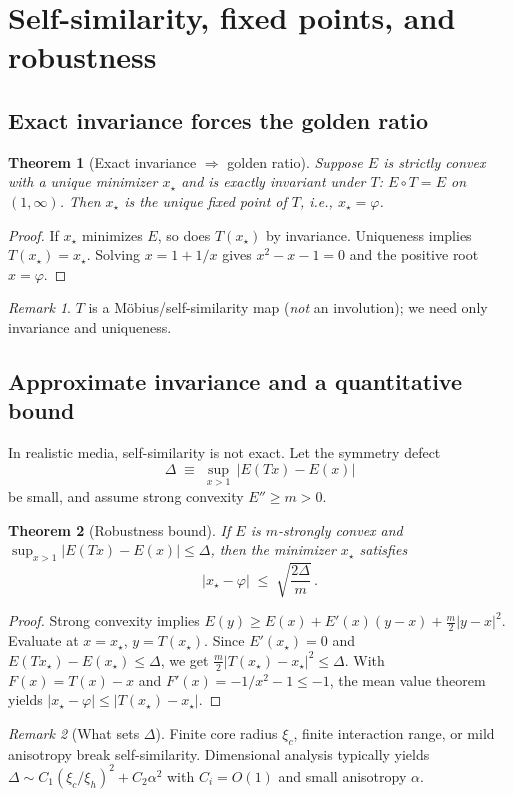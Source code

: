 \documentclass[11pt]{article}
\newtheorem{theorem}{Theorem}
\theoremstyle{remark}
\newtheorem{remark}{Remark}
\theoremstyle{definition}
\newcommand{\ph}{\varphi}
\begin{document}
\section{Self-similarity, fixed points, and robustness}
\subsection{Exact invariance forces the golden ratio}
\begin{theorem}[Exact invariance $\Rightarrow$ golden ratio]
Suppose $E$ is strictly convex with a unique minimizer $x_\star$ and is exactly invariant under $T$: $E\circ T=E$ on $(1,\infty)$. Then $x_\star$ is the unique fixed point of $T$, i.e., $x_\star=\ph$.
\end{theorem}
\begin{proof}
If $x_\star$ minimizes $E$, so does $T(x_\star)$ by invariance. Uniqueness implies $T(x_\star)=x_\star$. Solving $x=1+1/x$ gives $x^2-x-1=0$ and the positive root $x=\ph$.
\end{proof}
\begin{remark}
$T$ is a M\"obius/self-similarity map (\emph{not} an involution); we need only invariance and uniqueness.
\end{remark}

\subsection{Approximate invariance and a quantitative bound}
In realistic media, self-similarity is not exact. Let the symmetry defect
\begin{equation}
 \Delta\;\equiv\;\sup_{x>1}\,\bigl|E(Tx)-E(x)\bigr|
\end{equation}
be small, and assume strong convexity $E''\ge m>0$.
\begin{theorem}[Robustness bound]
\label{thm:robust}
If $E$ is $m$-strongly convex and $\sup_{x>1}|E(Tx)-E(x)|\le \Delta$, then the minimizer $x_\star$ satisfies
\begin{equation}
 \bigl|x_\star-\ph\bigr|\;\le\;\sqrt{\frac{2\Delta}{m}}\,.
\end{equation}
\end{theorem}
\begin{proof}
Strong convexity implies $E(y)\ge E(x)+E'(x)(y-x)+\tfrac{m}{2}|y-x|^2$. Evaluate at $x=x_\star$, $y=T(x_\star)$. Since $E'(x_\star)=0$ and $E(Tx_\star)-E(x_\star)\le \Delta$, we get $\tfrac{m}{2}|T(x_\star)-x_\star|^2\le \Delta$. With $F(x)=T(x)-x$ and $F'(x)=-1/x^2-1\le-1$, the mean value theorem yields $|x_\star-\ph|\le |T(x_\star)-x_\star|$.
\end{proof}
\begin{remark}[What sets $\Delta$]
Finite core radius $\xi_c$, finite interaction range, or mild anisotropy break self-similarity. Dimensional analysis typically yields $\Delta\sim C_1(\xi_c/\xi_h)^2 + C_2\alpha^2$ with $C_i=O(1)$ and small anisotropy $\alpha$.
\end{remark}
\end{document}
